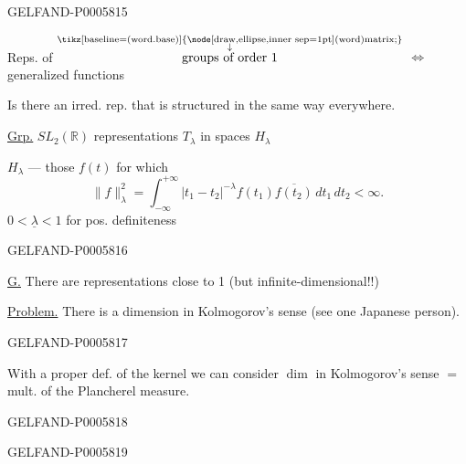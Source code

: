 \begin{GelfandAdjacentEvidence}{GELFAND-P000581}{5}


Reps. of
\(\overset{\substack{\text{\tikz[baseline=(word.base)]{\node[draw,ellipse,inner sep=1pt](word){\scriptsize matrix};}}\\[-2pt]\downarrow}}{\text{groups of order 1}}\)
\(\Longleftrightarrow\) generalized functions

Is there an irred. rep. that is structured in the same way everywhere.

\underline{\underline{Grp.}} \underline{\(SL_2(\mathbb R)\)}
representations \(T_\lambda\) in spaces \(H_\lambda\)

\(H_\lambda\) — those \(f(t)\) for which
\[
\|f\|_\lambda^2=
\int_{-\infty}^{+\infty}\lvert t_1-t_2\rvert^{-\lambda}
f(t_1)\overline{f(t_2)}\,dt_1\,dt_2<\infty.
\]
\hfill\(\underline{0<\lambda<1}\) for pos. definiteness\par
{}
\end{GelfandAdjacentEvidence}
\begin{GelfandAdjacentEvidence}{GELFAND-P000581}{6}


\underline{\underline{G.}} There are representations close to 1 (but infinite-dimensional!!)

\underline{Problem.} There is a dimension in Kolmogorov’s sense (see one Japanese person).
\end{GelfandAdjacentEvidence}
\begin{GelfandAdjacentEvidence}{GELFAND-P000581}{7}

With a proper def. of the kernel we can consider
\(\dim\) in Kolmogorov’s sense \(=\) mult. \sout{\textellipsis{}}
of the Plancherel measure.
\end{GelfandAdjacentEvidence}
\begin{GelfandAdjacentEvidence}{GELFAND-P000581}{8}

\end{GelfandAdjacentEvidence}
\begin{GelfandAdjacentEvidence}{GELFAND-P000581}{9}

\end{GelfandAdjacentEvidence}
